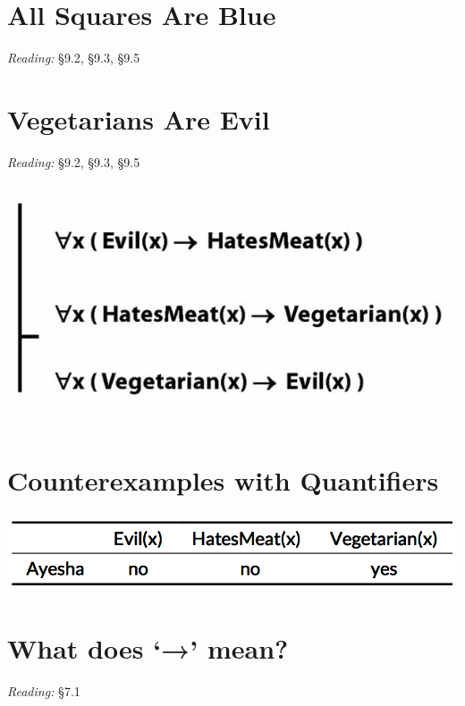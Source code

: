 \documentclass[12pt]{extarticle}
\begin{document}
\begin{multicols*}{3}
 
 
\section{All Squares Are Blue}
 
\emph{Reading:} §9.2, §9.3, §9.5
 
 
 
\section{Vegetarians Are Evil}
 
\emph{Reading:} §9.2, §9.3, §9.5
 
\begin{center}
\includegraphics[scale=0.3]{img/vegetarians.png}
\end{center}
 
 
\section{Counterexamples with Quantifiers}
 
\begin{center}
\includegraphics[scale=0.3]{img/unit_502b_counterexample.png}
\end{center}
 
 
\section{What does ‘→’ mean?}
 
\emph{Reading:} §7.1
 

\end{multicols*}
\end{document}
